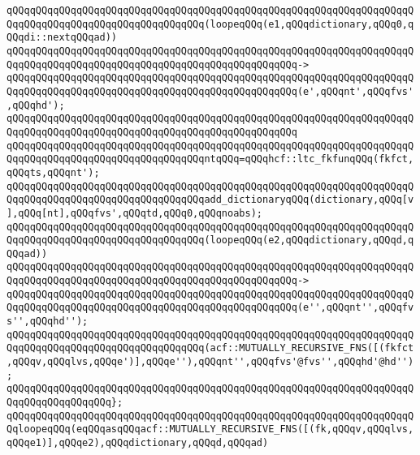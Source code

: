 \newline
\verb|qQQqqQQqqQQqqQQqqQQqqQQqqQQqqQQqqQQqqQQqqQQqqQQqqQQqqQQqqQQqqQQqqQQqqQQqqQQqqQQqqQQqqQQqqQQqqQQqqQQqqQQq(loopeqQQq(e1,qQQqdictionary,qQQq0,qQQqdi::nextqQQqad))|\newline
\verb|qQQqqQQqqQQqqQQqqQQqqQQqqQQqqQQqqQQqqQQqqQQqqQQqqQQqqQQqqQQqqQQqqQQqqQQqqQQqqQQqqQQqqQQqqQQqqQQqqQQqqQQqqQQqqQQqqQQqqQQq->|\newline
\verb|qQQqqQQqqQQqqQQqqQQqqQQqqQQqqQQqqQQqqQQqqQQqqQQqqQQqqQQqqQQqqQQqqQQqqQQqqQQqqQQqqQQqqQQqqQQqqQQqqQQqqQQqqQQqqQQqqQQqqQQq(e',qQQqnt',qQQqfvs',qQQqhd');|\newline
\verb|qQQqqQQqqQQqqQQqqQQqqQQqqQQqqQQqqQQqqQQqqQQqqQQqqQQqqQQqqQQqqQQqqQQqqQQqqQQqqQQqqQQqqQQqqQQqqQQqqQQqqQQqqQQqqQQqqQQqqQQq|\newline
\newline
\verb|qQQqqQQqqQQqqQQqqQQqqQQqqQQqqQQqqQQqqQQqqQQqqQQqqQQqqQQqqQQqqQQqqQQqqQQqqQQqqQQqqQQqqQQqqQQqqQQqqQQqqQQqntqQQq=qQQqhcf::ltc_fkfunqQQq(fkfct,qQQqts,qQQqnt');|\newline
\newline
\verb|qQQqqQQqqQQqqQQqqQQqqQQqqQQqqQQqqQQqqQQqqQQqqQQqqQQqqQQqqQQqqQQqqQQqqQQqqQQqqQQqqQQqqQQqqQQqqQQqqQQqqQQqadd_dictionaryqQQq(dictionary,qQQq[v],qQQq[nt],qQQqfvs',qQQqtd,qQQq0,qQQqnoabs);|\newline
\newline
\verb|qQQqqQQqqQQqqQQqqQQqqQQqqQQqqQQqqQQqqQQqqQQqqQQqqQQqqQQqqQQqqQQqqQQqqQQqqQQqqQQqqQQqqQQqqQQqqQQqqQQqqQQq(loopeqQQq(e2,qQQqdictionary,qQQqd,qQQqad))|\newline
\verb|qQQqqQQqqQQqqQQqqQQqqQQqqQQqqQQqqQQqqQQqqQQqqQQqqQQqqQQqqQQqqQQqqQQqqQQqqQQqqQQqqQQqqQQqqQQqqQQqqQQqqQQqqQQqqQQqqQQqqQQq->|\newline
\verb|qQQqqQQqqQQqqQQqqQQqqQQqqQQqqQQqqQQqqQQqqQQqqQQqqQQqqQQqqQQqqQQqqQQqqQQqqQQqqQQqqQQqqQQqqQQqqQQqqQQqqQQqqQQqqQQqqQQqqQQq(e'',qQQqnt'',qQQqfvs'',qQQqhd'');|\newline
\newline
\verb|qQQqqQQqqQQqqQQqqQQqqQQqqQQqqQQqqQQqqQQqqQQqqQQqqQQqqQQqqQQqqQQqqQQqqQQqqQQqqQQqqQQqqQQqqQQqqQQqqQQqqQQq(acf::MUTUALLY_RECURSIVE_FNS([(fkfct,qQQqv,qQQqlvs,qQQqe')],qQQqe''),qQQqnt'',qQQqfvs'@fvs'',qQQqhd'@hd'');|\newline
\verb|qQQqqQQqqQQqqQQqqQQqqQQqqQQqqQQqqQQqqQQqqQQqqQQqqQQqqQQqqQQqqQQqqQQqqQQqqQQqqQQqqQQqqQQq};|\newline
\newline
\verb|qQQqqQQqqQQqqQQqqQQqqQQqqQQqqQQqqQQqqQQqqQQqqQQqqQQqqQQqqQQqqQQqqQQqqQQqloopeqQQq(eqQQqasqQQqacf::MUTUALLY_RECURSIVE_FNS([(fk,qQQqv,qQQqlvs,qQQqe1)],qQQqe2),qQQqdictionary,qQQqd,qQQqad)|\newline
